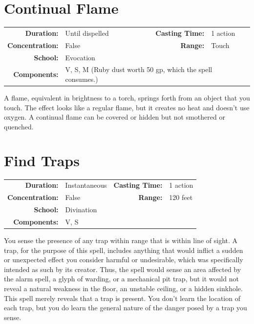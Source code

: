 \documentclass[12pt,showtrims]{memoir}
\begin{document}
\newpage
\section*{Continual Flame}

{
\small\centering\vspace{-6pt}
\begin{tabular}{rlrl}
\toprule

\textbf{Duration:} & Until dispelled &
\textbf{Casting Time:} & 1 action \\
\textbf{Concentration:} & False &
\textbf{Range:} & Touch \\
\textbf{School:} & Evocation \\
\textbf{Components:} & \multicolumn{3}{p{0.7\textwidth}}{V, S, M (Ruby dust worth 50 gp, which the spell consumes.)}\\

\bottomrule
\end{tabular}
}

\vspace{1\baselineskip}\noindent A flame, equivalent in brightness to a torch, springs forth from an object that you touch. The effect looks like a regular flame, but it creates no heat and doesn't use oxygen. A continual flame can be covered or hidden but not smothered or quenched.

\newpage
\section*{Find Traps}

{
\small\centering\vspace{-6pt}
\begin{tabular}{rlrl}
\toprule

\textbf{Duration:} & Instantaneous &
\textbf{Casting Time:} & 1 action \\
\textbf{Concentration:} & False &
\textbf{Range:} & 120 feet \\
\textbf{School:} & Divination \\
\textbf{Components:} & \multicolumn{3}{p{0.7\textwidth}}{V, S}\\

\bottomrule
\end{tabular}
}

\vspace{1\baselineskip}\noindent You sense the presence of any trap within range that is within line of sight. A trap, for the purpose of this spell, includes anything that would inflict a sudden or unexpected effect you consider harmful or undesirable, which was specifically intended as such by its creator. Thus, the spell would sense an area affected by the alarm spell, a glyph of warding, or a mechanical pit trap, but it would not reveal a natural weakness in the floor, an unstable ceiling, or a hidden sinkhole. This spell merely reveals that a trap is present. You don't learn the location of each trap, but you do learn the general nature of the danger posed by a trap you sense.
\end{document}
